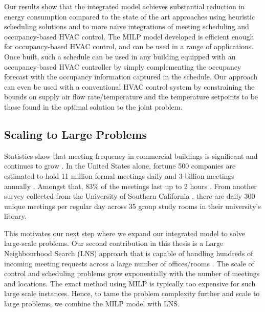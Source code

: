 Our results show that the integrated model achieves substantial reduction in energy consumption compared to the state of the art approaches using heuristic scheduling solutions and to more na\"{\i}ve integrations of meeting scheduling and occupancy-based HVAC
control. The MILP model developed is efficient enough for occupancy-based HVAC control, and can be used in a range of applications. Once built, such a schedule can be used in any building equipped with an occupancy-based HVAC controller by simply complementing the occupancy forecast \citep{mamidi2012adaptive} with the occupancy information captured in the schedule. Our approach can even be used with a conventional HVAC control system by constraining the bounds on supply air flow rate/temperature and the temperature setpoints to be those found in the optimal solution to the joint problem. 

\subsection{Scaling to Large Problems}


Statistics show that meeting frequency in commercial buildings is significant and continues to grow \citep{romano2001meeting,kim2014learning}. In the United States alone, fortune 500 companies are estimated to hold 11 million formal meetings daily and 3 billion meetings annually \citep{romano2001meeting}. Amongst that, 83\% of the meetings last up to 2 hours \citep{kim2014learning}. From another survey collected from the University of Southern California \citep{kwak2013tesla}, there are daily 300 unique meetings per regular day across 35 group study rooms in their university's library.

This motivates our next step where we expand our integrated model to solve large-scale problems. Our second contribution in this thesis is a Large Neighbourhood Search (LNS) approach that is capable of handling hundreds of incoming meeting requests across a large number of offices/rooms \citep{lim2015large}. The scale of control and scheduling problems grow exponentially with the number of meetings and locations. The exact method using MILP is typically too expensive for such large scale instances. Hence, to tame the problem complexity further and scale to large problems, we combine the MILP model with LNS. 

